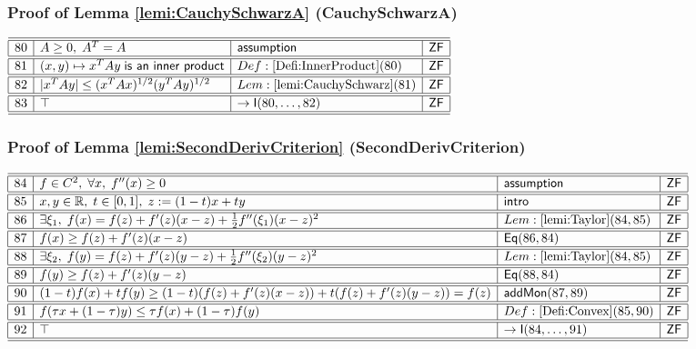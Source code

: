\documentclass[11pt,reqno]{amsart}
\begin{document}
\medskip

\subsubsection*{Proof of Lemma \ref{lemi:CauchySchwarzA} (\textsf{CauchySchwarzA})}

\noindent$%
\begin{array}{|r|l|l|l|}
\hline\hline
80 & A\ge0,\;A^{T}=A & \mathsf{assumption} & \mathsf{ZF} \\ \hline\hline
81 & (x,y)\mapsto x^{T}Ay\;\mathsf{is\ an\ inner\ product} & Def:\ref{Defi:InnerProduct}(80) & \mathsf{ZF} \\ \hline\hline
82 & |x^{T}Ay|\le(x^{T}Ax)^{1/2}(y^{T}Ay)^{1/2} & Lem:\ref{lemi:CauchySchwarz}(81) & \mathsf{ZF} \\ \hline\hline
83 & \top & \to\mathsf{I}(80,\dots,82) & \mathsf{ZF} \\ \hline\hline
\end{array}%
$

\medskip

\subsubsection*{Proof of Lemma \ref{lemi:SecondDerivCriterion} (\textsf{SecondDerivCriterion})}

\noindent$%
\begin{array}{|r|l|l|l|}
\hline\hline
84 & f\in C^{2},\;\forall x,\;f^{\prime\prime}(x)\ge0 & \mathsf{assumption} & \mathsf{ZF} \\ \hline\hline
85 & x,y\in\mathbb{R},\;t\in[0,1],\;z:=(1-t)x+ty & \mathsf{intro} & \mathsf{ZF} \\ \hline\hline
86 & \exists\xi_{1},\;f(x)=f(z)+f^{\prime}(z)(x-z)+\tfrac12 f^{\prime\prime}(\xi_{1})(x-z)^{2} & Lem:\ref{lemi:Taylor}(84,85) & \mathsf{ZF} \\ \hline\hline
87 & f(x)\ge f(z)+f^{\prime}(z)(x-z) & \mathsf{Eq}(86,84) & \mathsf{ZF} \\ \hline\hline
88 & \exists\xi_{2},\;f(y)=f(z)+f^{\prime}(z)(y-z)+\tfrac12 f^{\prime\prime}(\xi_{2})(y-z)^{2} & Lem:\ref{lemi:Taylor}(84,85) & \mathsf{ZF} \\ \hline\hline
89 & f(y)\ge f(z)+f^{\prime}(z)(y-z) & \mathsf{Eq}(88,84) & \mathsf{ZF} \\ \hline\hline
90 & (1-t)f(x)+tf(y)\ge(1-t)(f(z)+f^{\prime}(z)(x-z))+t(f(z)+f^{\prime}(z)(y-z))=f(z) & \mathsf{addMon}(87,89) & \mathsf{ZF} \\ \hline\hline
91 & f(\tau x+(1-\tau)y)\le\tau f(x)+(1-\tau)f(y) & Def:\ref{Defi:Convex}(85,90) & \mathsf{ZF} \\ \hline\hline
92 & \top & \to\mathsf{I}(84,\dots,91) & \mathsf{ZF} \\ \hline\hline
\end{array}%
$
\end{document}

